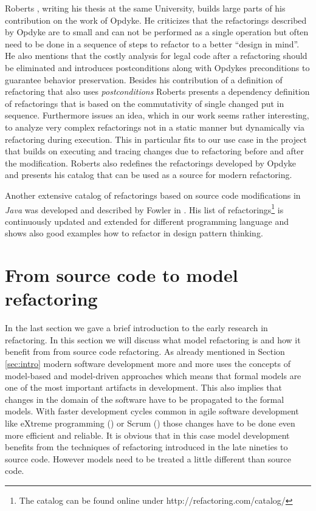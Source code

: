 \documentclass{llncs}
\begin{document}
Roberts \cite{rob99}, writing his thesis at the same University, builds large parts of his contribution on the work of
Opdyke. He criticizes that the refactorings described by Opdyke are to small and can not be performed as a single
operation but often need to be done in a sequence of steps to refactor to a better ``design in mind''.  He also mentions
that the costly analysis for legal code after a refactoring should be eliminated and introduces postconditions along
with Opdykes preconditions to guarantee behavior preservation. Besides his contribution of a definition of refactoring
that also uses \textit{postconditions} Roberts presents a dependency definition of refactorings that is based on the
commutativity of single changed put in sequence. Furthermore issues an idea, which in our work seems rather interesting,
to analyze very complex refactorings not in a static manner but dynamically via refactoring during execution. This in
particular fits to our use case in the project that builds on executing and tracing changes due to refactoring before
and after the modification. Roberts also redefines the refactorings developed by Opdyke and presents his catalog that
can be used as a source for modern refactoring.

Another extensive catalog of refactorings based on source code modifications in \textit{Java} was developed and
described by Fowler in \cite{fow99}. His list of refactorings\footnote{The catalog can be found online under
http://refactoring.com/catalog/} is continuously updated and extended for different programming language and shows also
good examples how to refactor in design pattern thinking.

\section{From source code to model refactoring}
\label{sec:fromto}

In the last section we gave a brief introduction to the early research in refactoring. In this section we will discuss
what model refactoring is and how it benefit from from source code refactoring. As already mentioned in Section
\ref{sec:intro} modern software development more and more uses the concepts of model-based and model-driven approaches
which means that formal models are one of the most important artifacts in development. This also implies that changes in
the domain of the software have to be propagated to the formal models. With faster development cycles common in agile
software development like eXtreme programming (\cite{DBLP:journals/computer/Beck99}) or Scrum
(\cite{DBLP:journals/software/RisingJ00}) those changes have to be done even more efficient and reliable. It is obvious
that in this case model development benefits from the techniques of refactoring introduced in the late nineties to
source code. However models need to be treated a little different than source code.
\end{document}
